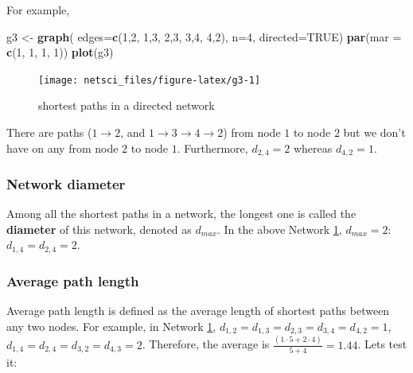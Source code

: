\documentclass[
]{krantz}
\makeatletter
\newenvironment{Shaded}{\begin{snugshade}}{\end{snugshade}}
\newcommand{\DataTypeTok}[1]{\textcolor[rgb]{0.27,0.27,0.27}{#1}}
\newcommand{\DecValTok}[1]{\textcolor[rgb]{0.06,0.06,0.06}{#1}}
\newcommand{\KeywordTok}[1]{\textcolor[rgb]{0.27,0.27,0.27}{\textbf{#1}}}
\newcommand{\NormalTok}[1]{#1}
\newcommand{\OtherTok}[1]{\textcolor[rgb]{0.37,0.37,0.37}{#1}}
\newcommand{\StringTok}[1]{\textcolor[rgb]{0.5,0.5,0.5}{#1}}
\newenvironment{kframe}{%
\medskip{}
\setlength{\fboxsep}{.8em}
 \def\at@end@of@kframe{}%
 \ifinner\ifhmode%
  \def\at@end@of@kframe{\end{minipage}}%
  \begin{minipage}{\columnwidth}%
 \fi\fi%
 \def\FrameCommand##1{\hskip\@totalleftmargin \hskip-\fboxsep
 \colorbox{shadecolor}{##1}\hskip-\fboxsep
     \hskip-\linewidth \hskip-\@totalleftmargin \hskip\columnwidth}%
 \MakeFramed {\advance\hsize-\width
   \@totalleftmargin\z@ \linewidth\hsize
   \@setminipage}}%
 {\par\unskip\endMakeFramed%
 \at@end@of@kframe}
\renewenvironment{Shaded}{\begin{kframe}}{\end{kframe}}
\makeatother
\begin{document}
For example,

\begin{Shaded}
\begin{Highlighting}[]
\NormalTok{g3 <-}\StringTok{ }\KeywordTok{graph}\NormalTok{( }\DataTypeTok{edges=}\KeywordTok{c}\NormalTok{(}\DecValTok{1}\NormalTok{,}\DecValTok{2}\NormalTok{, }\DecValTok{1}\NormalTok{,}\DecValTok{3}\NormalTok{, }\DecValTok{2}\NormalTok{,}\DecValTok{3}\NormalTok{, }\DecValTok{3}\NormalTok{,}\DecValTok{4}\NormalTok{, }\DecValTok{4}\NormalTok{,}\DecValTok{2}\NormalTok{), }\DataTypeTok{n=}\DecValTok{4}\NormalTok{, }\DataTypeTok{directed=}\OtherTok{TRUE}\NormalTok{)}
\KeywordTok{par}\NormalTok{(}\DataTypeTok{mar =} \KeywordTok{c}\NormalTok{(}\DecValTok{1}\NormalTok{, }\DecValTok{1}\NormalTok{, }\DecValTok{1}\NormalTok{, }\DecValTok{1}\NormalTok{))}
\KeywordTok{plot}\NormalTok{(g3)}
\end{Highlighting}
\end{Shaded}

\begin{figure}

{\centering \texttt{[image: netsci\_files/figure-latex/g3-1]} 

}

\caption{shortest paths in a directed network}\label{fig:g3}
\end{figure}

There are paths (\(1 \to 2\), and \(1 \to 3 \to 4 \to 2\)) from node \(1\) to node \(2\) but we don't have on any from node \(2\) to node \(1\). Furthermore, \(d_{2, 4} = 2\) whereas \(d_{4,2} = 1\).

\hypertarget{network-diameter}{%
\subsubsection{Network diameter}\label{network-diameter}}

Among all the shortest paths in a network, the longest one is called the \textbf{diameter} of this network, denoted as \(d_{max}\). In the above Network \ref{fig:g3}, \(d_{max} = 2\): \(d_{1,4} = d_{2,4} = 2\).

\hypertarget{average-path-length}{%
\subsubsection{Average path length}\label{average-path-length}}

Average path length is defined as the average length of shortest paths between any two nodes. For example, in Network \ref{fig:g3}, \(d_{1,2} = d_{1,3} = d_{2,3} = d_{3,4} = d_{4,2} = 1\), \(d_{1,4} = d_{2,4} = d_{3,2} = d_{4,3} = 2\). Therefore, the average is \(\frac{(1 \cdot 5 + 2 \cdot 4)}{5 + 4} = 1.44\). Lets test it:
\end{document}
